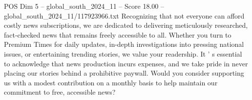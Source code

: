 \begin{textsample}{POS Dim 5 – global\_south\_2024\_11 – Score 18.00 – global\_south\_2024\_11/117923966.txt}
Recognizing that not everyone can afford costly news subscriptions, we are dedicated to delivering meticulously researched, fact-checked news that remains freely accessible to all.
Whether you turn to Premium Times for daily updates, in-depth investigations into pressing national issues, or entertaining trending stories, we value your readership.
It ' s essential to acknowledge that news production incurs expenses, and we take pride in never placing our stories behind a prohibitive paywall.
Would you consider supporting us with a modest contribution on a monthly basis to help maintain our commitment to free, accessible news?

\end{textsample}
